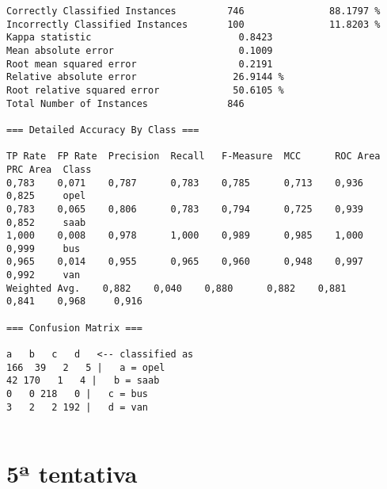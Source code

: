 \documentclass[
	article,			%
	11pt,				%
	oneside,			%
	a4paper,			%
	english,			%
	brazil,				%
	sumario=tradicional
	]{abntex2}
\begin{document}
\begin{lstlisting}
Correctly Classified Instances         746               88.1797 %
Incorrectly Classified Instances       100               11.8203 %
Kappa statistic                          0.8423
Mean absolute error                      0.1009
Root mean squared error                  0.2191
Relative absolute error                 26.9144 %
Root relative squared error             50.6105 %
Total Number of Instances              846     

=== Detailed Accuracy By Class ===

TP Rate  FP Rate  Precision  Recall   F-Measure  MCC      ROC Area  PRC Area  Class
0,783    0,071    0,787      0,783    0,785      0,713    0,936     0,825     opel
0,783    0,065    0,806      0,783    0,794      0,725    0,939     0,852     saab
1,000    0,008    0,978      1,000    0,989      0,985    1,000     0,999     bus
0,965    0,014    0,955      0,965    0,960      0,948    0,997     0,992     van
Weighted Avg.    0,882    0,040    0,880      0,882    0,881      0,841    0,968     0,916     

=== Confusion Matrix ===

a   b   c   d   <-- classified as
166  39   2   5 |   a = opel
42 170   1   4 |   b = saab
0   0 218   0 |   c = bus
3   2   2 192 |   d = van


\end{lstlisting}

\newpage

\section{5ª tentativa}
\end{document}
